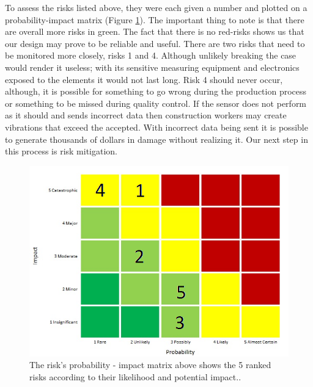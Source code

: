 \documentclass[12pt]{article}
\begin{document}
To assess the risks listed above, they were each given a number and plotted on a probability-impact matrix (Figure \ref{fig:ranked_risks}). The important thing to note is that there are overall more risks in green. The fact that there is no red-risks shows us that our design may prove to be reliable and useful. There are two risks that need to be monitored more closely, risks 1 and 4. Although unlikely breaking the case would render it useless; with its sensitive measuring equipment and electronics exposed to the elements it would not last long. Risk 4 should never occur, although, it is possible for something to go wrong during the production process or something to be missed during quality control. If the sensor does not perform as it should and sends incorrect data then construction workers may create vibrations that exceed the accepted. With incorrect data being sent it is possible to generate thousands of dollars in damage without realizing it. Our next step in this process is risk mitigation.
\begin{figure}[H]
    \centering
    \includegraphics[width=.6\textwidth]{src/ranked_risks.png}
    \caption{The risk’s probability - impact matrix above shows the 5 ranked risks according to their likelihood and potential impact..}
    \label{fig:ranked_risks}
\end{figure}
\end{document}
